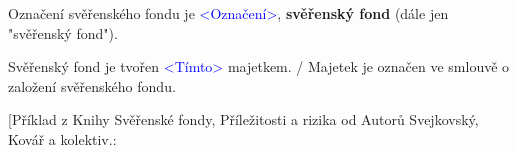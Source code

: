 \documentclass[parskip=half]{scrreprt}
\begin{document}
\begin{contract}






Označení svěřenského fondu je \textcolor{blue}{<Označení>}, \textbf{svěřenský fond} (dále jen "svěřenský fond").


Svěřenský fond je tvořen \textcolor{blue}{<Tímto>} majetkem. / Majetek je označen ve smlouvě o založení svěřenského fondu.

\parnumberfalse
[Příklad z Knihy Svěřenské fondy, Příležitosti a rizika od Autorů Svejkovský, Kovář a kolektiv.: \\


\end{contract}
\end{document}
